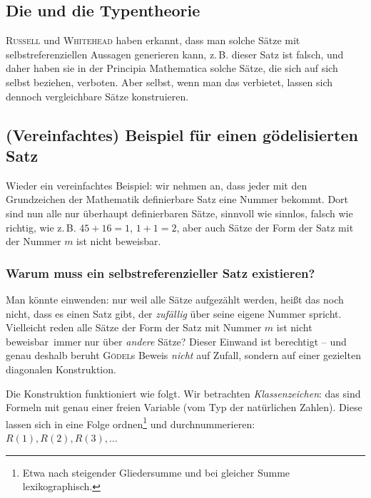 \subsection*{Die  und die Typentheorie}

\textsc{Russell} und \textsc{Whitehead} haben erkannt, dass man solche Sätze mit selbstreferenziellen
Aussagen generieren kann, z.\,B. \frq dieser Satz ist falsch\flq, und daher haben sie
in der Principia Mathematica solche Sätze, die sich auf sich selbst beziehen,
\frq verboten\flq{}.
Aber selbst, wenn man das verbietet, lassen sich dennoch ver\-gleich\-bare Sätze
konstruieren.

\subsection*{(Vereinfachtes) Beispiel für einen gödelisierten Satz}

Wieder ein vereinfachtes Beispiel: wir nehmen an, dass jeder mit den Grundzeichen
der Mathematik definierbare Satz eine Nummer bekommt. Dort sind nun alle nur überhaupt
definierbaren Sätze, sinnvoll wie sinnlos, falsch wie richtig,
wie z.\,B. \frq $45 + 16 = 1$\flq, \frq $1 + 1 = 2$\flq, aber auch Sätze der Form
\frq der Satz mit der Nummer $m$ ist nicht beweisbar\flq.

\subsubsection*{Warum muss ein selbstreferenzieller Satz existieren?}

Man könnte einwenden: nur weil alle Sätze aufgezählt werden, heißt das noch nicht,
dass es einen Satz gibt, der \textit{zufällig} über seine eigene Nummer spricht.
Vielleicht reden alle Sätze der Form \frq der Satz mit Nummer $m$ ist nicht beweisbar\flq\
immer nur über \textit{andere} Sätze? Dieser Einwand ist berechtigt -- und genau deshalb
beruht \textsc{Gödel}s Beweis \textit{nicht} auf Zufall, sondern auf einer gezielten
diagonalen Konstruktion.

Die Konstruktion funktioniert wie folgt. Wir betrachten \textit{Klassenzeichen}:
das sind Formeln mit genau einer freien Variable (vom Typ der natürlichen Zahlen).
Diese lassen sich in eine Folge ordnen\footnote{Etwa nach steigender Gliedersumme
und bei gleicher Summe lexikographisch.} und durchnummerieren:
$R(1), R(2), R(3), \dots$

